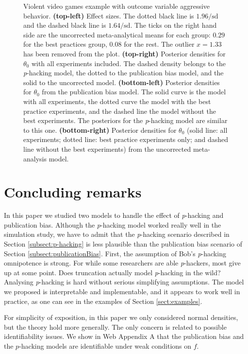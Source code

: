 \documentclass[useAMS,usenatbib,referee]{biom}
\begin{document}
\begin{figure}
\caption{\label{fig:anderson2010}Violent video games example with outcome variable aggressive behavior. \textbf{(top-left)} Effect sizes. The dotted black line is $1.96/\textrm{sd}$ and the dashed black line is $1.64/\textrm{sd}$. The ticks on the right hand side are the uncorrected meta-analytical means for each group: $0.29$ for the best practices group, $0.08$ for the rest. The outlier $x=1.33$ has been removed from the plot.
\textbf{(top-right)} Posterior densities for $\theta_{0}$ with all experiments included. The dashed density belongs to the \textit{p}-hacking model, the dotted to the publication bias model, and the solid to the uncorrected model. \textbf{(bottom-left)} Posterior densities for $\theta_{0}$ from the publication bias model. The solid curve is the model with all experiments, the dotted curve the model with the best practice experiments, and the dashed line the model without the best experiments. The posteriors for the \textit{p}-hacking model are similar to this one. \textbf{(bottom-right)} Posterior densities for $\theta_{0}$ (solid line: all experiments; dotted line: best practice experiments only; and dashed line without the best experiments) from the uncorrected meta-analysis model.}
\end{figure}

\section{Concluding remarks}\label{sect:conclusions}

In this paper we studied two models to handle the effect of \textit{p}-hacking and publication bias. Although the \textit{p}-hacking model worked really well in the simulation study, we have to admit that the \textit{p}-hacking scenario described in Section \ref{subsect:p-hacking} is less plausible than the publication bias scenario of Section \ref{subsect:publicationBias}. First, the assumption of Bob's \textit{p}-hacking omnipotence is strong. For while some researchers are able \textit{p}-hackers, most give up at some point. Does truncation actually model \textit{p}-hacking in the wild? Analysing \textit{p}-hacking is hard without serious simplifying assumptions. The model we proposed is interpretable and implementable, and it appears to work well in practice, as one can see in the examples of Section \ref{sect:examples}. 

For simplicity of exposition, in this paper we only considered normal densities, but the theory hold more generally. The only concern is related to possible identifiability issues. We show in Web Appendix A that the publication bias and the $p$-hacking models are identifiable under weak conditions on $f$.
\end{document}
